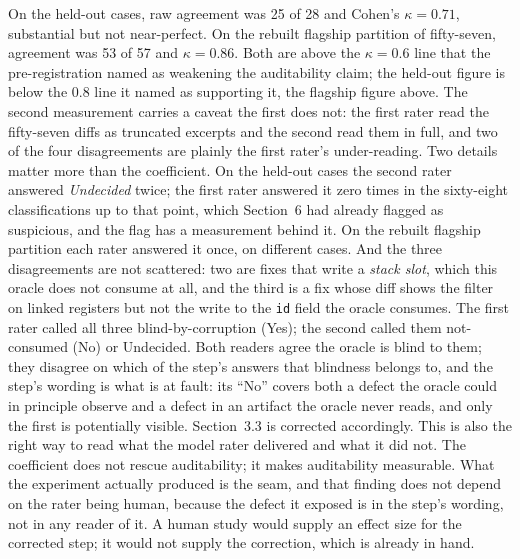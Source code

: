 On the held-out cases, raw agreement was 25 of 28 and Cohen's $\kappa = 0.71$,
substantial but not near-perfect. On the rebuilt flagship partition of fifty-seven,
agreement was 53 of 57 and $\kappa = 0.86$. Both are above the $\kappa = 0.6$ line that the
pre-registration named as weakening the auditability claim; the held-out figure is below
the $0.8$ line it named as supporting it, the flagship figure above. The second measurement carries a
caveat the first does not: the first rater read the fifty-seven diffs as truncated
excerpts and the second read them in full, and two of the four disagreements are
plainly the first rater's under-reading. Two details matter more than the coefficient. On the held-out cases the second rater
answered \emph{Undecided} twice; the first rater answered it zero times in the
sixty-eight classifications up to that point, which Section~6 had already flagged as
suspicious, and the flag has a measurement behind it. On the rebuilt flagship
partition each rater answered it once, on different cases. And the three disagreements are not
scattered: two are fixes that write a \emph{stack slot}, which this oracle does not
consume at all, and the third is a fix whose diff shows the filter on linked registers but
not the write to the \texttt{id} field the oracle consumes. The first rater called all
three blind-by-corruption (Yes); the second called them not-consumed (No) or Undecided. Both readers agree the oracle is blind to
them; they disagree on which of the step's answers that blindness belongs to, and the
step's wording is what is at fault: its ``No'' covers both a defect the oracle could
in principle observe and a defect in an artifact the oracle never reads, and only the
first is potentially visible. Section~3.3 is corrected accordingly. This is also the
right way to read what the model rater delivered and what it did not. The coefficient
does not rescue auditability; it makes auditability measurable. What the experiment
actually produced is the seam, and that finding does not depend on the rater being
human, because the defect it exposed is in the step's wording, not in any reader of
it. A human study would supply an effect size for the corrected step; it would not
supply the correction, which is already in hand.
